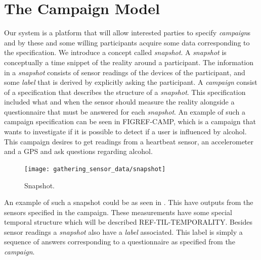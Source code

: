 
\section{The Campaign Model}

Our system is a platform that will allow interested parties to specify \emph{campaign}s and by these and some willing participants acquire some data corresponding to the specification. We introduce a concept called \emph{snapshot}. A \emph{snapshot} is conceptually a time snippet of the reality around a participant. The information in a \emph{snapshot} consists of sensor readings of the devices of the participant, and some \emph{label} that is derived by explicitly asking the participant. A \emph{campaign} consist of a specification that describes the structure of a \emph{snapshot}. This specification included what and when the sensor should measure the reality alongside a questionnaire that must be answered for each \emph{snapshot}. An example of such a campaign specification can be seen in FIGREF-CAMP, which is a campaign that wants to investigate if it is possible to detect if a user is influenced by alcohol. This campaign desires to get readings from a heartbeat sensor, an accelerometer and a GPS and ask questions regarding alcohol.

\begin{figure}[!htbp]
    \centering
    \texttt{[image: gathering\_sensor\_data/snapshot]}
    \caption{Snapshot.}
    \label{fig:snapshot_example}
\end{figure}
\FloatBarrier

An example of such a snapshot could be as seen in . This have outputs from the sensors specified in the campaign. These measurements have some special temporal structure which will be described REF-TIL-TEMPORALITY. Besides sensor readings a \emph{snapshot} also have a \emph{label} associated. This label is simply a sequence of answers corresponding to a questionnaire as specified from the \emph{campaign}. 






